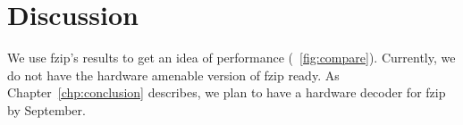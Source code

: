 
\section{Discussion}
\label{sec:fzipdiscussion}
We use fzip's results to get an idea of performance (\figurename~\ref{fig:compare}). Currently, we do not have the hardware amenable version of fzip ready. As Chapter~\ref{chp:conclusion} describes, we plan to have a hardware decoder for fzip by September.
